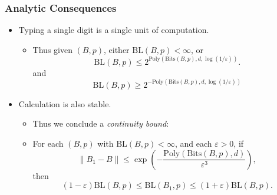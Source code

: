 \documentclass[usenames,dvipsnames,12pt]{beamer}
\begin{document}
\begin{frame}
    \frametitle{Analytic Consequences}

    \begin{itemize}
        \pause
        \item Typing a single digit is a single unit of computation.

        \pause
        \begin{itemize}
            \item Thus given $(B,p)$, either $\text{BL}(B,p) < \infty$, or
           \[ \text{BL}(B,p) \leq 2^{\text{Poly}(\text{Bits}(B,p),d,\log(1/\varepsilon))}. \]
           and
           \[ \text{BL}(B,p) \geq 2^{-\text{Poly}(\text{Bits}(B,p),d,\log(1/\varepsilon))} \]
        \end{itemize}

        \pause
        \item Calculation is also stable.

        \pause
        \begin{itemize}
            \item Thus we conclude a \emph{continuity bound}:
            \pause

            \item For each $(B,p)$ with $\text{BL}(B,p) < \infty$, and each $\varepsilon > 0$, \pause if
            \[ \| B_1 - B \| \leq \exp \left( - \frac{\text{Poly}(\text{Bits}(B,p), d)}{\varepsilon^3} \right), \]
            \pause
            then
            \[ (1 - \varepsilon) \text{BL}(B,p) \leq \text{BL}(B_1,p) \leq (1 + \varepsilon) \text{BL}(B,p). \]
        \end{itemize}
    \end{itemize}
\end{frame}




\end{document}
